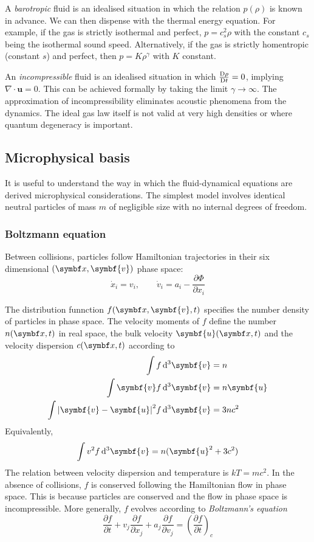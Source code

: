 \documentclass{jknotes}
\begin{document}
A \emph{barotropic} fluid is an idealised situation in which the relation $p(\rho)$
is known in advance. We can then dispense with the thermal energy equation.
For example, if the gas is strictly isothermal and perfect, $p = c_s^2 \rho$
with the constant $c_s$ being the isothermal sound speed. Alternatively, if
the gas is strictly homentropic (constant $s$) and perfect, then $p = K
\rho^\gamma$ with $K$ constant. 

An \emph{incompressible} fluid is an idealised situation in which
$\frac{\mathrm{D} \rho}{\mathrm{D} t} = 0$, implying $\nabla \cdot \symbf{u} = 0$.
This can be achieved formally by taking the limit $\gamma \to \infty$. The
approximation of incompressibility eliminates acoustic phenomena from the
dynamics. The ideal gas law itself is not valid at very high densities or
where quantum degeneracy is important.

\subsection{Microphysical basis}
It is useful to understand the way in which the fluid-dynamical equations are
derived microphysical considerations. The simplest model involves identical
neutral particles of mass $m$ of negligible size with no internal degrees of
freedom.

\subsubsection{Boltzmann equation}
Between collisions, particles follow Hamiltonian trajectories in their six
dimensional $(\x, \symbf{v})$ phase space:
\begin{equation}
	\dot{x}_i = v_i, \hspace{2em} \dot{v}_i = a_i - \frac{\partial
	\Phi}{\partial x_i}
\end{equation}

The distribution funnction $f(\x, \symbf{v},t)$ specifies the number density
of particles in phase space. The velocity moments of $f$ define the number
$n(\x,t)$ in real space, the bulk velocity $\symbf{u}(\x,t)$ and the velocity
dispersion $c(\x,t)$ according to
\begin{align}
	\int f \, \diffd^3 \symbf{v} &= n\\
	\int \symbf{v} f \, \diffd^3 \symbf{v} &= n \symbf{u} \\
	\int \abs{\symbf{v}-\symbf{u}}^2 f \, \diffd^3 \symbf{v} &= 3nc^2
\end{align}
Equivalently,
\begin{equation}
	\int v^2 f \, \diffd^3 \symbf{v} = n (\symbf{u}^2 + 3c^2)
\end{equation}
The relation between velocity dispersion and temperature is $kT = mc^2$. In
the absence of collisions, $f$ is conserved following the Hamiltonian flow in
phase space. This is because particles are conserved and the flow in phase
space is incompressible. More generally, $f$ evolves according to
\emph{Boltzmann's equation}
\begin{equation}
	\frac{\partial f}{\partial t} + v_j \frac{\partial f}{\partial x_j} + a_j
	\frac{\partial f}{\partial v_j} = \left( \frac{\partial f}{\partial
	t}\right)_c
\end{equation}
\end{document}
